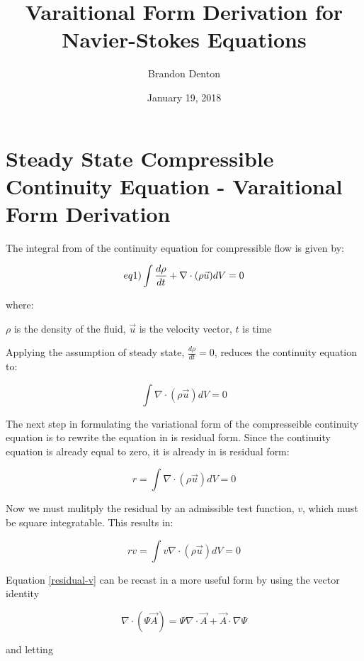 \documentclass{report}
\begin{document}
\title{Varaitional Form Derivation for Navier-Stokes Equations}
\author{Brandon Denton}
\date{January 19, 2018}

\section{Steady State Compressible Continuity Equation - Varaitional Form Derivation}

The integral from of the continuity equation for compressible flow is given by:

\begin{equation} \label(eq1)
\int \frac{d\rho}{dt}  + \nabla \cdot (\rho \vec{u} ) dV = 0
\end{equation}

where:

$\rho$	is the density of the fluid,
$\vec{u}$	is the velocity vector,
$t$	is time

Applying the assumption of steady state, $\frac{d\rho}{dt} = 0$, reduces the continuity equation to:

\begin{equation} \label{eq2}
\int \nabla \cdot (\rho \vec{u} ) dV = 0
\end{equation}

The next step in formulating the variational form of the compresseible continuity equation is to 
rewrite the equation in is residual form. Since the continuity equation is already equal to zero,
it is already in is residual form:

\begin{equation} \label{residual}
r = \int \nabla \cdot (\rho \vec{u} ) dV = 0
\end{equation}

Now we must mulitply the residual by an admissible test function, $v$, which must be square integratable.
This results in:

\begin{equation} \label{residual-v}
rv = \int v \nabla \cdot (\rho \vec{u} ) dV = 0
\end{equation}

Equation \ref{residual-v} can be recast in a more useful form by using the vector identity

\begin{equation} \label{vecIdent}
\nabla \cdot (\Psi \vec{A}) = \Psi \nabla \cdot \vec{A} + \vec{A} \cdot \nabla\Psi
\end{equation}

and letting
\end{document}
